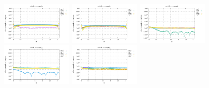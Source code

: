 \noindent
\includegraphics[width=3.5cm]{python_codes/fieldstone_152/RESULTS/exp1_2D/vel_64_m2}
\includegraphics[width=3.5cm]{python_codes/fieldstone_152/RESULTS/exp1_2D/vel_64_m3}
\includegraphics[width=3.5cm]{python_codes/fieldstone_152/RESULTS/exp1_2D/vel_64_m4}
\includegraphics[width=3.5cm]{python_codes/fieldstone_152/RESULTS/exp1_2D/vel_64_m5}
\includegraphics[width=3.5cm]{python_codes/fieldstone_152/RESULTS/exp1_2D/vel_64_m6}

